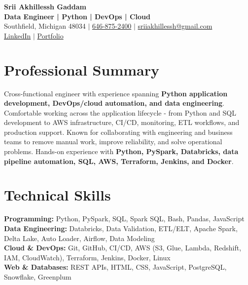 \documentclass[letterpaper,10pt]{article}
\begin{document}
\fontsize{9.35pt}{10.45pt}\selectfont

\begin{center}
    {\LARGE \textbf{Srii Akhillessh Gaddam}} \\[-1pt]
    \textbf{Data Engineer | Python | DevOps | Cloud} \\[2pt]
    Southfield, Michigan 48034 $|$
    \href{tel:6468752400}{646-875-2400} $|$
    \href{mailto:sriiakhillessh@gmail.com}{sriiakhillessh@gmail.com} \\[1pt]
    \href{https://www.linkedin.com/in/srii-akhiilessh-gaddam-b48668191/}{LinkedIn} $|$
    \href{https://sriiakhillesshg.github.io/portfolio/}{Portfolio}
\end{center}
\vspace{-8pt}

\section{Professional Summary}
\small{Cross-functional engineer with experience spanning \textbf{Python application development, DevOps/cloud automation, and data engineering}. Comfortable working across the application lifecycle - from Python and SQL development to AWS infrastructure, CI/CD, monitoring, ETL workflows, and production support. Known for collaborating with engineering and business teams to remove manual work, improve reliability, and solve operational problems. Hands-on experience with \textbf{Python, PySpark, Databricks, data pipeline automation, SQL, AWS, Terraform, Jenkins, and Docker}.}

\section{Technical Skills}
\small{
\textbf{Programming:} Python, PySpark, SQL, Spark SQL, Bash, Pandas, JavaScript \\
\textbf{Data Engineering:} Databricks, Data Validation, ETL/ELT, Apache Spark, Delta Lake, Auto Loader, Airflow, Data Modeling \\
\textbf{Cloud \& DevOps:} Git, GitHub, CI/CD, AWS (S3, Glue, Lambda, Redshift, IAM, CloudWatch), Terraform, Jenkins, Docker, Linux \\
\textbf{Web \& Databases:} REST APIs, HTML, CSS, JavaScript, PostgreSQL, Snowflake, Greenplum
}

\end{document}
